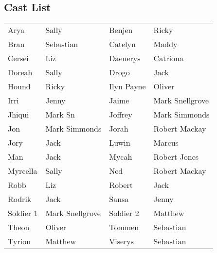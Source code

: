 \subsection*{Cast List}
\begin{tabular}{ll|ll}\\
Arya & Sally &  Benjen & Ricky\\
Bran & Sebastian &  Catelyn & Maddy\\
Cersei & Liz &  Daenerys & Catriona\\
Doreah & Sally &  Drogo & Jack\\
Hound & Ricky &  Ilyn Payne & Oliver\\
Irri & Jenny &  Jaime & Mark Snellgrove\\
Jhiqui & Mark Sn &  Joffrey & Mark Simmonds\\
Jon & Mark Simmonds &  Jorah & Robert Mackay\\
Jory & Jack &  Luwin & Marcus\\
Man & Jack &  Mycah & Robert Jones\\
Myrcella & Sally &  Ned & Robert Mackay\\
Robb & Liz &  Robert & Jack\\
Rodrik & Jack &  Sansa & Jenny\\
Soldier 1 & Mark Snellgrove &  Soldier 2 & Matthew\\
Theon & Oliver &  Tommen & Sebastian\\
Tyrion & Matthew &  Viserys & Sebastian\\
\end{tabular}
